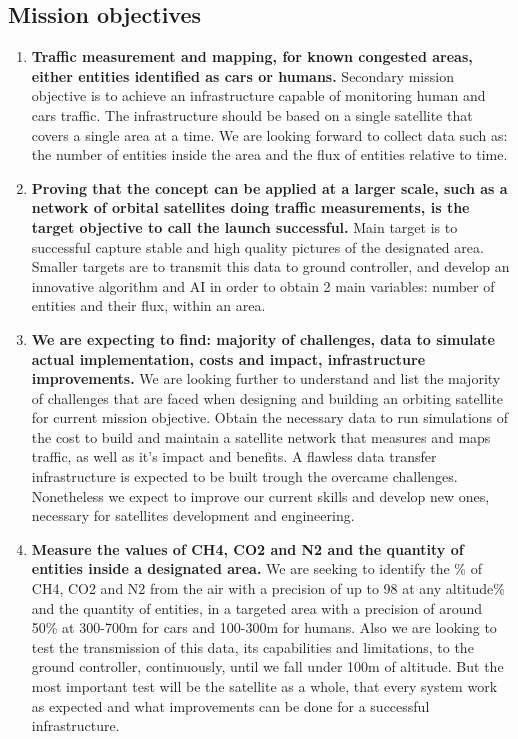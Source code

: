 \documentclass[11pt]{article}
\begin{document}
\subsection{Mission objectives}
\begin{enumerate}
    \item\textbf{Traffic measurement and mapping, for known congested areas, either entities identified as cars or humans.} {Secondary mission objective is to achieve an infrastructure capable of monitoring human and cars traffic. The infrastructure should be based on a single satellite that covers a single area at a time. We are looking forward to collect data such as: the number of entities inside the area and the flux of entities relative to time.}
    \item\textbf{Proving that the concept can be applied at a larger scale, such as a network of orbital satellites doing traffic measurements, is the target objective to call the launch successful.} {Main target is to successful capture stable and high quality pictures of the designated area. Smaller targets are to transmit this data to ground controller, and develop an innovative algorithm and AI in order to obtain 2 main variables: number of entities and their flux, within an area.}
    \item\textbf{We are expecting to find: majority of challenges, data to simulate actual implementation, costs and impact, infrastructure improvements.} {We are looking further to understand and list the majority of challenges that are faced when designing and building an orbiting satellite for current mission objective. Obtain the necessary data to run simulations of the cost to build and maintain a satellite network that measures and maps traffic, as well as it's impact and benefits. A flawless data transfer infrastructure is expected to be built trough the overcame challenges. Nonetheless we expect to improve our current skills and develop new ones, necessary for satellites development and engineering.}
    \item\textbf{Measure the values of CH4, CO2 and N2 and the quantity of entities inside a designated area.} {We are seeking to identify the \% of CH4, CO2 and N2 from the air with a precision of up to 98 at any altitude\% and the quantity of entities, in a targeted area with a precision of around 50\% at 300-700m for cars and 100-300m for humans. Also we are looking to test the transmission of this data, its capabilities and limitations, to the ground controller, continuously, until we fall under 100m of altitude. But the most important test will be the satellite as a whole, that every system work as expected and what improvements can be done for a successful infrastructure.}
\end{enumerate}
\end{document}
